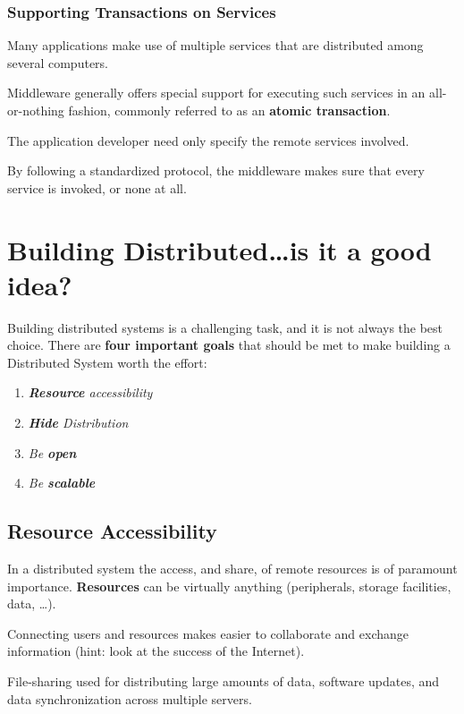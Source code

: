 \subsubsection{Supporting Transactions on Services}
Many applications make use of multiple services that are distributed among several computers.

Middleware generally offers special support for executing such services in an all-or-nothing fashion, commonly referred to as an \textbf{atomic transaction}.


The application developer need only specify the remote services involved.

By following a standardized protocol, the middleware makes sure that every service is invoked, or none at all.

\section{Building Distributed\dots is it a good idea?}
Building distributed systems is a challenging task, and it is not always the best choice.
There are \textbf{four important goals} that should be met to make building a Distributed System worth the effort:
\begin{enumerate}
   \item \textit{\textbf{Resource} accessibility}
   \item \textit{\textbf{Hide} Distribution}
   \item \textit{Be \textbf{open}}
   \item \textit{Be \textbf{scalable}}
\end{enumerate}

\subsection{Resource Accessibility}
In a distributed system the access, and share, of remote resources is of paramount importance.
\textbf{Resources} can be virtually anything (peripherals, storage facilities, data, \dots).

Connecting users and resources makes easier to collaborate and exchange information (hint: look at the success of the Internet).

File-sharing used for distributing large amounts of data, software updates, and data synchronization across multiple servers.

